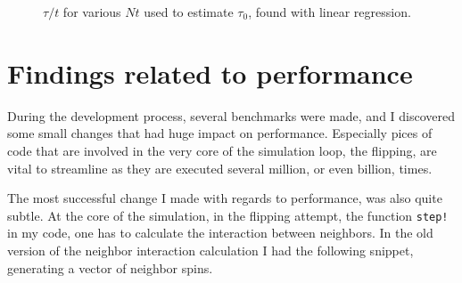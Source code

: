 \documentclass[12pt, a4paper]{article}
\begin{document}
\begin{figure}[H]
  \centering
  \caption{$\tau/t$ for various $Nt$ used to estimate $\tau_0$, found with linear regression.
    \label{fig:tau_TN}}
\end{figure}


\section{Findings related to performance\label{sec:performance}}
During the development process, several benchmarks were made, and I discovered some small changes that had huge impact on performance.
Especially pices of code that are involved in the very core of the simulation loop, the flipping, are vital to streamline as they are executed several million, or even billion, times.

The most successful change I made with regards to performance, was also quite subtle.
At the core of the simulation, in the flipping attempt, the function \verb|step!| in my code, one has to calculate the interaction between neighbors.
In the old version of the neighbor interaction calculation I had the following snippet, generating a vector of neighbor spins.
\end{document}
